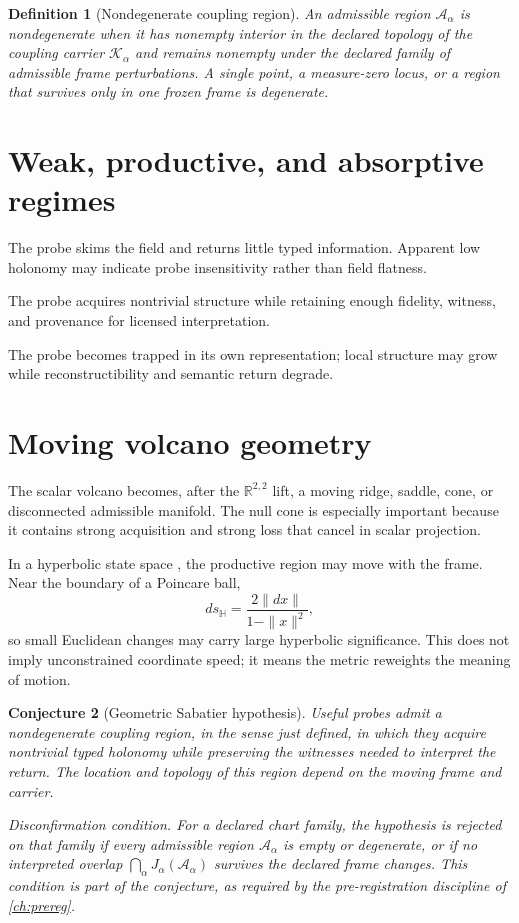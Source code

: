 \documentclass[12pt,openany]{book}
\newtheorem{definition}{Definition}[chapter]
\newtheorem{conjecture}[definition]{Conjecture}
\theoremstyle{remark}
\begin{document}
\begin{definition}[Nondegenerate coupling region]
An admissible region $\mathcal A_\alpha$ is nondegenerate when it has nonempty interior in the declared topology of the coupling carrier $\mathcal K_\alpha$ and remains nonempty under the declared family of admissible frame perturbations. A single point, a measure-zero locus, or a region that survives only in one frozen frame is degenerate.
\end{definition}

\section{Weak, productive, and absorptive regimes}
\begin{description}[style=nextline,leftmargin=4.2cm,labelwidth=3.8cm,labelsep=0.35cm]
\item[Weak coupling.] The probe skims the field and returns little typed information. Apparent low holonomy may indicate probe insensitivity rather than field flatness.
\item[Productive coupling.] The probe acquires nontrivial structure while retaining enough fidelity, witness, and provenance for licensed interpretation.
\item[Absorptive coupling.] The probe becomes trapped in its own representation; local structure may grow while reconstructibility and semantic return degrade.
\end{description}

\section{Moving volcano geometry}
The scalar volcano becomes, after the $\mathbb R^{2,2}$ lift, a moving ridge, saddle, cone, or disconnected admissible manifold. The null cone is especially important because it contains strong acquisition and strong loss that cancel in scalar projection.

In a hyperbolic state space \cite{NickelKiela,Bronstein2021}, the productive region may move with the frame. Near the boundary of a Poincare ball,
\[
ds_{\mathbb H}=\frac{2\|dx\|}{1-\|x\|^2},
\]
so small Euclidean changes may carry large hyperbolic significance. This does not imply unconstrained coordinate speed; it means the metric reweights the meaning of motion.

\begin{conjecture}[Geometric Sabatier hypothesis]
Useful probes admit a nondegenerate coupling region, in the sense just defined, in which they acquire nontrivial typed holonomy while preserving the witnesses needed to interpret the return. The location and topology of this region depend on the moving frame and carrier.

\emph{Disconfirmation condition.} For a declared chart family, the hypothesis is rejected on that family if every admissible region $\mathcal A_\alpha$ is empty or degenerate, or if no interpreted overlap $\bigcap_\alpha J_\alpha(\mathcal A_\alpha)$ survives the declared frame changes. This condition is part of the conjecture, as required by the pre-registration discipline of \cref{ch:prereg}.
\end{conjecture}
\end{document}
